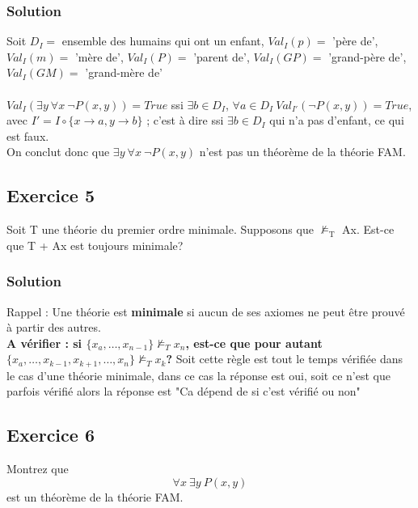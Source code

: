     \subsubsection*{Solution}
    \noindent Soit $D_I =$ ensemble des humains qui ont un enfant, $Val_I(p) = $ 'père de', $Val_I(m) = $ 'mère de', $Val_I(P) = $ 'parent de', $Val_I(GP) = $ 'grand-père de', $Val_I(GM) = $ 'grand-mère de'\\
    \\
    $Val_I (\exists y \ \forall x \ \neg P(x, y)) = True$ ssi $\exists b \in D_I$, $\forall a \in D_I \ Val_{I'}(\neg P(x, y)) = True$, avec $I' = I \circ \{x \rightarrow a, y \rightarrow b\}$ ; c'est à dire ssi $\exists b \in D_I$ qui n'a pas d'enfant, ce qui est faux.\\
    On conclut donc que $\exists y \ \forall x \ \neg P(x, y) $ n'est pas un théorème de la théorie FAM.
    

\subsection*{Exercice 5}
Soit T une th\'{e}orie du premier ordre minimale. Supposons que $\not\models_\text{T}$ Ax.
Est-ce que T + Ax est toujours minimale?


    \subsubsection*{Solution}
    Rappel : Une théorie est \textbf{minimale} si aucun de ses axiomes ne peut être prouvé à partir des autres.\\

\textbf{A vérifier : si $\{x_a,\dots ,x_{n-1}\} \not\models_{T} x_n$, est-ce que pour autant $\{x_a,\dots ,x_{k-1},x_{k+1},\dots ,x_n\} \not\models_{T} x_k$?}
Soit cette règle est tout le temps vérifiée dans le cas d'une théorie minimale, dans ce cas la réponse est oui, soit ce n'est que parfois vérifié alors la réponse est "Ca dépend de si c'est vérifié ou non"
\subsection*{Exercice 6}
Montrez que 
$$
\forall x \ \exists y \ P(x, y)
$$
est un th\'{e}or\`{e}me de la th\'{e}orie FAM.


